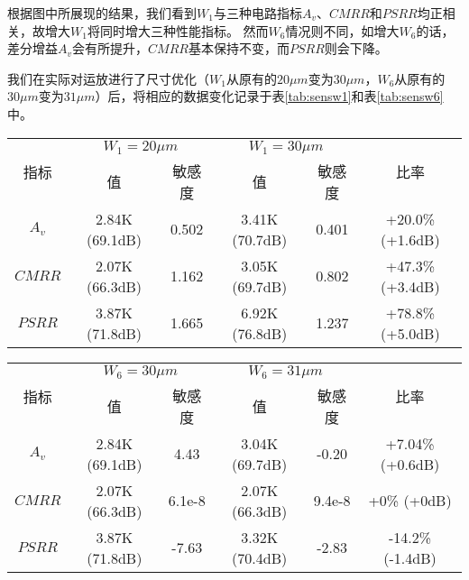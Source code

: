 根据图中所展现的结果，我们看到$W_1$与三种电路指标$A_v$、$CMRR$和$PSRR$均正相关，故增大$W_1$将同时增大三种性能指标。
然而$W_6$情况则不同，如增大$W_6$的话，差分增益$A_v$会有所提升，$CMRR$基本保持不变，而$PSRR$则会下降。

我们在实际对运放进行了尺寸优化（$W_1$从原有的$20\mu m$变为$30\mu m$，$W_6$从原有的$30\mu m$变为$31\mu m$）后，将相应的数据变化记录于表\ref{tab:sensw1}和表\ref{tab:sensw6}中。

\begin{table}[!htp]
	\centering
	\begin{tabular}{c|c|c|c|c|c}
		\hline
		\multirow{2}{*}{指标} & \multicolumn{2}{c|}{$W_1=20\mu m$} & \multicolumn{2}{c|}{$W_1=30\mu m$} & \multirow{2}{*}{比率} \\ \cline{2-5}
		                    &       值        &        敏感度        &       值        &        敏感度        &  \\ \hline
		       $A_v$        & 2.84K (69.1dB) &       0.502       & 3.41K (70.7dB) &       0.401       &  +20.0\% (+1.6dB)   \\ \hline
		      $CMRR$        & 2.07K (66.3dB) &       1.162       & 3.05K (69.7dB) &       0.802       &  +47.3\% (+3.4dB)   \\ \hline
		      $PSRR$        & 3.87K (71.8dB) &       1.665       & 6.92K (76.8dB) &       1.237       &  +78.8\% (+5.0dB)   \\ \hline
	\end{tabular}
\end{table}

\begin{table}[!htp]
	\centering
	\begin{tabular}{c|c|c|c|c|c}
		\hline
		\multirow{2}{*}{指标} & \multicolumn{2}{c|}{$W_6=30\mu m$} & \multicolumn{2}{c|}{$W_6=31\mu m$} & \multirow{2}{*}{比率} \\ \cline{2-5}
		                    &       值        &        敏感度        &       值        &        敏感度        &  \\ \hline
		       $A_v$        & 2.84K (69.1dB) &       4.43        & 3.04K (69.7dB) &       -0.20       &  +7.04\% (+0.6dB)   \\ \hline
		      $CMRR$        & 2.07K (66.3dB) &      6.1e-8       & 2.07K (66.3dB) &      9.4e-8       &     +0\% (+0dB)     \\ \hline
		      $PSRR$        & 3.87K (71.8dB) &       -7.63       & 3.32K (70.4dB) &       -2.83       &  -14.2\% (-1.4dB)   \\ \hline
	\end{tabular}
\end{table}

